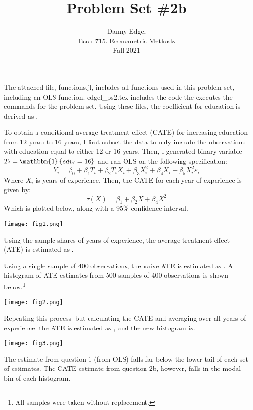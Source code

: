 \documentclass{article}
\newcommand{\one}[1]{\mathbbm{1}\left\{#1\right\}}
\newcommand{\eps}{\varepsilon}
\begin{document}
\title{	Problem Set \#2b }
\author{ 	Danny Edgel 					\\ 
			Econ 715: Econometric Methods	\\
			Fall 2021						
		}
\maketitle\thispagestyle{empty}


\noindent The attached file, functions.jl, includes all functions used in this problem set, including an OLS function. edgel\_ps2.tex includes the code the executes the commands for the problem set. Using these files, the coefficient for education is derived as .

To obtain a conditional average treatment effect (CATE) for increasing education from 12 years to 16 years, I first subset the data to only include the observations with education equal to either 12 or 16 years. Then, I generated binary variable ${T_i = \one{edu_i = 16}}$ and ran OLS on the following specification:\[
    Y_i = \beta_0 + \beta_1T_i + \beta_2T_iX_i + \beta_3X_i^2 + \beta_4X_i + \beta_5X_i^2 \eps_i
\]
Where $X_i$ is years of experience. Then, the CATE for each year of experience is given by:\[
    \tau(X) = \beta_1 + \beta_2X + \beta_4X^2
\]
Which is plotted below, along with a 95\% confidence interval.
\begin{center}
    \texttt{[image: fig1.png]}
\end{center}
Using the sample shares of years of experience, the average treatment effect (ATE) is estimated as . 

Using a single sample of 400 observations, the naive ATE is estimated as . A histogram of ATE estimates from 500 samples of 400 observations is shown below.\footnote{All samples were taken without replacement.}
\begin{center}
    \texttt{[image: fig2.png]}
\end{center}
Repeating this process, but calculating the CATE and averaging over all years of experience, the ATE is estimated as , and the new histogram is:
\begin{center}
    \texttt{[image: fig3.png]}
\end{center}
The estimate from question 1 (from OLS) falls far below the lower tail of each set of estimates. The CATE estimate from question 2b, however, falls in the modal bin of each histogram.
\end{document}
